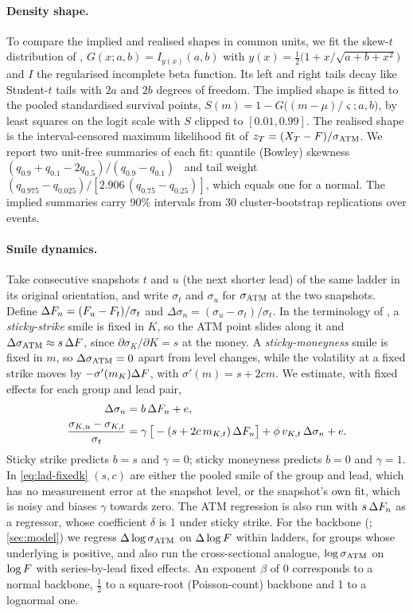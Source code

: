 \paragraph{Density shape.}
To compare the implied and realised shapes in common units, we fit the skew-$t$ distribution of
\citet{jonesfaddy2003}, $G(x;a,b)=I_{y(x)}(a,b)$ with $y(x)=\tfrac12\big(1+x/\sqrt{a+b+x^2}\big)$
and $I$ the regularised incomplete beta function. Its left and right tails decay like Student-$t$
tails with $2a$ and $2b$ degrees of freedom. The implied shape is fitted to the pooled
standardised survival points, $S(m)=1-G\big((m-\mu)/\varsigma;a,b\big)$, by least squares on the
logit scale with $S$ clipped to $[0.01,0.99]$. The realised shape is the interval-censored maximum
likelihood fit of $z_T=(X_T-F)/\sigma_{\mathrm{ATM}}$. We report two unit-free summaries of each fit: quantile
(Bowley) skewness $(q_{0.9}+q_{0.1}-2q_{0.5})/(q_{0.9}-q_{0.1})$~\citep{groeneveld1984} and tail
weight $(q_{0.975}-q_{0.025})/[2.906\,(q_{0.75}-q_{0.25})]$, which equals one for a normal. The
implied summaries carry 90\% intervals from 30 cluster-bootstrap replications over events.

\paragraph{Smile dynamics.}
Take consecutive snapshots $t$ and $u$ (the next shorter lead) of the same ladder in its original
orientation, and write $\sigma_t$ and $\sigma_u$ for $\sigma_{\mathrm{ATM}}$ at the two snapshots. Define
$\Delta F_n=(F_u-F_t)/\sigma_t$ and $\Delta\sigma_n=(\sigma_u-\sigma_t)/\sigma_t$. In the terminology
of \citet{derman1999}, a \emph{sticky-strike} smile is fixed in $K$, so the ATM point slides along
it and $\Delta\sigma_{\mathrm{ATM}}\approx s\,\Delta F$, since $\partial\sigma_K/\partial K=s$ at the money. A
\emph{sticky-moneyness} smile is fixed in $m$, so $\Delta\sigma_{\mathrm{ATM}}=0$ apart from level changes, while
the volatility at a fixed strike moves by $-\sigma'(m_K)\Delta F$, with
$\sigma'(m)=s+2cm$. We estimate, with fixed effects for each group and lead pair,
\begin{align}
  \Delta\sigma_n&=b\,\Delta F_n+e, \label{eq:lad-atm}\\
  \frac{\sigma_{K,u}-\sigma_{K,t}}{\sigma_t}&=\gamma\,\big[-(s+2c\,m_{K,t})\,\Delta F_n\big]
     +\phi\,v_{K,t}\,\Delta\sigma_n+e. \label{eq:lad-fixedk}
\end{align}
Sticky strike predicts $b=s$ and $\gamma=0$; sticky moneyness predicts $b=0$ and $\gamma=1$. In
\eqref{eq:lad-fixedk} $(s,c)$ are either the pooled smile of the group and lead, which has no
measurement error at the snapshot level, or the snapshot's own fit, which is noisy and biases
$\gamma$ towards zero. The ATM regression is also run with $s\,\Delta F_n$ as a regressor, whose
coefficient $\delta$ is 1 under sticky strike. For the backbone (\citet{hagan2002}; \cref{sec:model})
we regress $\Delta\log\sigma_{\mathrm{ATM}}$ on $\Delta\log F$ within ladders, for groups whose underlying is
positive, and also run the cross-sectional analogue, $\log\sigma_{\mathrm{ATM}}$ on $\log F$ with series-by-lead
fixed effects. An exponent $\beta$ of 0 corresponds to a normal backbone, $\tfrac12$ to a
square-root (Poisson-count) backbone and 1 to a lognormal one.


